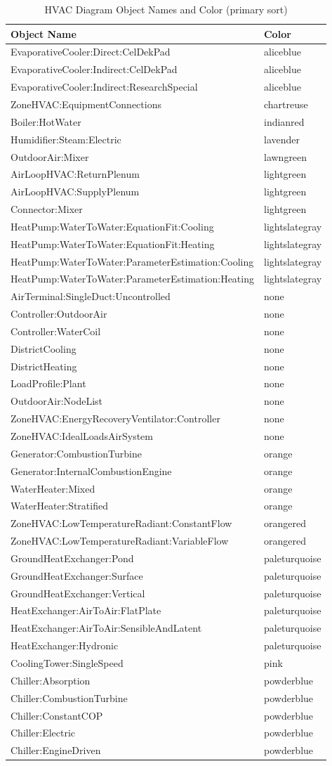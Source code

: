 \begin{longtable}[c]{@{}ll@{}}
\caption{HVAC Diagram Object Names and Color (primary sort) \protect \label{table:hvac-diagram-object-names-and-color-primary}}\\
\toprule 
Object Name & Color \tabularnewline \midrule
\endhead
EvaporativeCooler:Direct:CelDekPad & aliceblue \tabularnewline
EvaporativeCooler:Indirect:CelDekPad & aliceblue \tabularnewline
EvaporativeCooler:Indirect:ResearchSpecial & aliceblue \tabularnewline
ZoneHVAC:EquipmentConnections & chartreuse \tabularnewline
Boiler:HotWater & indianred \tabularnewline
Humidifier:Steam:Electric & lavender \tabularnewline
OutdoorAir:Mixer & lawngreen \tabularnewline
AirLoopHVAC:ReturnPlenum & lightgreen \tabularnewline
AirLoopHVAC:SupplyPlenum & lightgreen \tabularnewline
Connector:Mixer & lightgreen \tabularnewline
HeatPump:WaterToWater:EquationFit:Cooling & lightslategray \tabularnewline
HeatPump:WaterToWater:EquationFit:Heating & lightslategray \tabularnewline
HeatPump:WaterToWater:ParameterEstimation:Cooling & lightslategray \tabularnewline
HeatPump:WaterToWater:ParameterEstimation:Heating & lightslategray \tabularnewline
AirTerminal:SingleDuct:Uncontrolled & none \tabularnewline
Controller:OutdoorAir & none \tabularnewline
Controller:WaterCoil & none \tabularnewline
DistrictCooling & none \tabularnewline
DistrictHeating & none \tabularnewline
LoadProfile:Plant & none \tabularnewline
OutdoorAir:NodeList & none \tabularnewline
ZoneHVAC:EnergyRecoveryVentilator:Controller & none \tabularnewline
ZoneHVAC:IdealLoadsAirSystem & none \tabularnewline
Generator:CombustionTurbine & orange \tabularnewline
Generator:InternalCombustionEngine & orange \tabularnewline
WaterHeater:Mixed & orange \tabularnewline
WaterHeater:Stratified & orange \tabularnewline
ZoneHVAC:LowTemperatureRadiant:ConstantFlow & orangered \tabularnewline
ZoneHVAC:LowTemperatureRadiant:VariableFlow & orangered \tabularnewline
GroundHeatExchanger:Pond & paleturquoise \tabularnewline
GroundHeatExchanger:Surface & paleturquoise \tabularnewline
GroundHeatExchanger:Vertical & paleturquoise \tabularnewline
HeatExchanger:AirToAir:FlatPlate & paleturquoise \tabularnewline
HeatExchanger:AirToAir:SensibleAndLatent & paleturquoise \tabularnewline
HeatExchanger:Hydronic & paleturquoise \tabularnewline
CoolingTower:SingleSpeed & pink \tabularnewline
Chiller:Absorption & powderblue \tabularnewline
Chiller:CombustionTurbine & powderblue \tabularnewline
Chiller:ConstantCOP & powderblue \tabularnewline
Chiller:Electric & powderblue \tabularnewline
Chiller:EngineDriven & powderblue \tabularnewline

\end{longtable}
